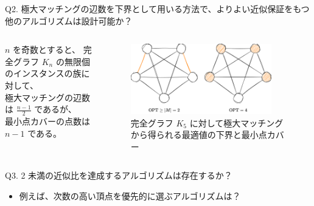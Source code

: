 \documentclass[aspectratio=169]{beamer}
\begin{document}
\begin{frame}{Q2. 極大マッチングの辺数を下界として用いる方法で、よりよい近似保証をもつ\\他のアルゴリズムは設計可能か？}
	\begin{example}
		\begin{columns}
			\begin{column}{0.5\textwidth}
				\(n\) を奇数とすると、
				完全グラフ \(K_n\) の無限個のインスタンスの族に対して、\\
				極大マッチングの辺数は \(\frac{n-1}{2}\) であるが、\\
				最小点カバーの点数は \(n-1\) である。
			\end{column}
			\begin{column}{0.5\textwidth}
				\begin{figure}
					\centering
					\includegraphics[width=0.9\textwidth]{figures/complete.png}
					\caption{完全グラフ \(K_5\) に対して極大マッチングから得られる最適値の下界と最小点カバー}
				\end{figure}
			\end{column}
		\end{columns}
	\end{example}

\end{frame}

\begin{frame}{Q3. 2 未満の近似比を達成するアルゴリズムは存在するか？}
	\begin{itemize}
		\item 例えば、次数の高い頂点を優先的に選ぶアルゴリズムは？
	\end{itemize}
\end{frame}

\appendix
\end{document}
